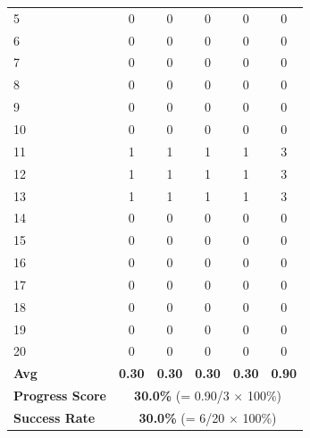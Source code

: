 \documentclass[onecolumn]{robbyant}           %
\begin{document}
\begin{table}[t]
\begin{tabular}{l|c|ccc|c}
5  & 0 & 0 & 0 & 0 & 0 \\
6  & 0 & 0 & 0 & 0 & 0 \\
7  & 0 & 0 & 0 & 0 & 0 \\
8  & 0 & 0 & 0 & 0 & 0 \\
9  & 0 & 0 & 0 & 0 & 0 \\
10 & 0 & 0 & 0 & 0 & 0 \\
11 & 1 & 1 & 1 & 1 & 3 \\
12 & 1 & 1 & 1 & 1 & 3 \\
13 & 1 & 1 & 1 & 1 & 3 \\
14 & 0 & 0 & 0 & 0 & 0 \\
15 & 0 & 0 & 0 & 0 & 0 \\
16 & 0 & 0 & 0 & 0 & 0 \\
17 & 0 & 0 & 0 & 0 & 0 \\
18 & 0 & 0 & 0 & 0 & 0 \\
19 & 0 & 0 & 0 & 0 & 0 \\
20 & 0 & 0 & 0 & 0 & 0 \\
\midrule
\textbf{Avg} & \textbf{0.30} & \textbf{0.30} & \textbf{0.30} & \textbf{0.30} & \textbf{0.90} \\
\textbf{Progress Score} & \multicolumn{5}{c}{\textbf{30.0\%} (= 0.90/3 $\times$ 100\%)} \\
\textbf{Success Rate} & \multicolumn{5}{c}{\textbf{30.0\%} (= 6/20 $\times$ 100\%)} \\
\bottomrule
\end{tabular}
\end{table}

\end{document}
